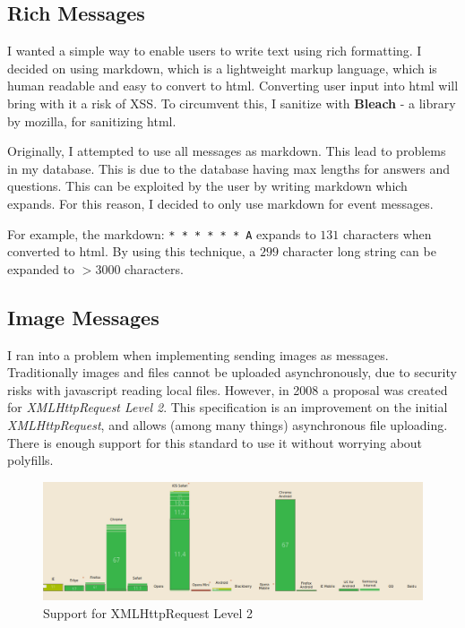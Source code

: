 \documentclass[12pt, draft]{report}
\begin{document}
	\subsection{Rich Messages}
	I wanted a simple way to enable users to write text using rich formatting. I decided on using markdown, which is a lightweight markup language, which is human readable and easy to convert to html. Converting user input into html will bring with it a risk of XSS. To circumvent this, I sanitize with \textbf{Bleach} - a library by mozilla, for sanitizing html.


	Originally, I attempted to use all messages as markdown. This lead to problems in my database. This is due to the database having max lengths for answers and questions. This can be exploited by the user by writing markdown which expands. For this reason, I decided to only use markdown for event messages.

	\begin{framed}
		For example, the markdown: \verb+* * * * * * A+ expands to \(131\) characters when converted to html. By using this technique, a \(299\) character long string can be expanded to \(> 3000\) characters.
	\end{framed}


	\subsection{Image Messages}
	I ran into a problem when implementing sending images as messages. Traditionally images and files cannot be uploaded asynchronously, due to security risks with javascript reading local files. However, in 2008 a proposal was created for \textit{XMLHttpRequest Level 2}. This specification is an improvement on the initial \textit{XMLHttpRequest}, and allows (among many things) asynchronous file uploading. There is enough support for this standard to use it without worrying about polyfills.

	\begin{figure}[H]
		\caption{Support for XMLHttpRequest Level 2}
		\includegraphics[width=\linewidth]{static/xmlhttp2support.png}
	\end{figure}
\end{document}
